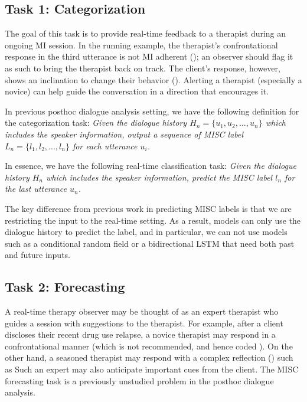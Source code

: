 \subsection{Task 1: Categorization}
\label{ssec:snt:task-categorization}
The goal of this task is to provide real-time feedback to a
therapist during an ongoing MI session. In the running example, the
therapist's confrontational response in the third utterance is not
MI adherent (\MIN); an observer should flag it as such to bring the
therapist back on track. The client's response, however, shows an
inclination to change their behavior (\CHANGE). Alerting a therapist
(especially a novice) can help guide the conversation in a direction
that encourages it.

In previous posthoc dialogue analysis setting, we have the following
definition for the categorization task: \emph{Given the dialogue
  history $H_n=\{u_{1},u_{2}, ..., u_{n}\}$ which includes the speaker
  information, output a sequence of MISC label
  $L_n=\{l_{1}, l_{2}, ..., l_{n}\}$ for each utterance $u_i$.}

In essence, we have the following real-time classification task:
\emph{Given the dialogue history $H_n$ which includes the speaker
  information, predict the MISC label $l_n$ for the last utterance
  $u_n$.}

The key difference from previous work in predicting MISC labels is
that we are restricting the input to the real-time setting. As a
result, models can only use the dialogue history to predict the label,
and in particular, we can not use models such as a conditional random
field or a bidirectional LSTM that need both past and future inputs.




\subsection{Task 2: Forecasting}
\label{ssec:snt:task-forecasting}
A real-time therapy observer may be thought of as an expert
therapist who guides a session with suggestions to the therapist.
For example, after a client discloses their recent drug use
relapse, a novice therapist may respond in a confrontational manner
(which is not recommended, and hence coded \MIN). On the other
hand, a seasoned therapist may respond with a complex reflection
(\REC) such as 
Such an expert may also anticipate important cues
from the client.%
The MISC forecasting task is a previously unstudied problem in the
posthoc dialogue analysis.

